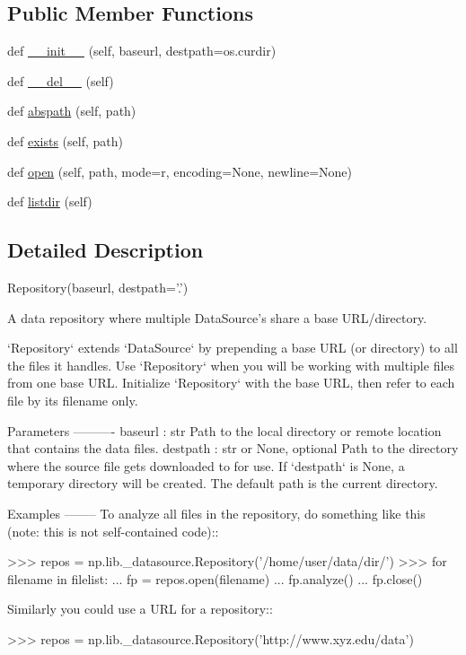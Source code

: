 \subsection*{Public Member Functions}
\begin{DoxyCompactItemize}
\item 
def \hyperlink{classnumpy_1_1lib_1_1__datasource_1_1Repository_a189f98cd6d7fda31f82e16f34f7ca822}{\+\_\+\+\_\+init\+\_\+\+\_\+} (self, baseurl, destpath=os.\+curdir)
\item 
def \hyperlink{classnumpy_1_1lib_1_1__datasource_1_1Repository_af4351dafdaa76531954a2df8117617c8}{\+\_\+\+\_\+del\+\_\+\+\_\+} (self)
\item 
def \hyperlink{classnumpy_1_1lib_1_1__datasource_1_1Repository_a8535769f09538e2a46e2417ac36e1dfc}{abspath} (self, path)
\item 
def \hyperlink{classnumpy_1_1lib_1_1__datasource_1_1Repository_aa3c775ac9ca505033fcaa34327f3e81b}{exists} (self, path)
\item 
def \hyperlink{classnumpy_1_1lib_1_1__datasource_1_1Repository_a3bc743780b0bc4148dca0dbf5f3d7f18}{open} (self, path, mode=\textquotesingle{}r\textquotesingle{}, encoding=None, newline=None)
\item 
def \hyperlink{classnumpy_1_1lib_1_1__datasource_1_1Repository_a5712ee37b741dedc92dc0e45490cf982}{listdir} (self)
\end{DoxyCompactItemize}


\subsection{Detailed Description}
\begin{DoxyVerb}Repository(baseurl, destpath='.')

A data repository where multiple DataSource's share a base
URL/directory.

`Repository` extends `DataSource` by prepending a base URL (or
directory) to all the files it handles. Use `Repository` when you will
be working with multiple files from one base URL.  Initialize
`Repository` with the base URL, then refer to each file by its filename
only.

Parameters
----------
baseurl : str
    Path to the local directory or remote location that contains the
    data files.
destpath : str or None, optional
    Path to the directory where the source file gets downloaded to for
    use.  If `destpath` is None, a temporary directory will be created.
    The default path is the current directory.

Examples
--------
To analyze all files in the repository, do something like this
(note: this is not self-contained code)::

    >>> repos = np.lib._datasource.Repository('/home/user/data/dir/')
    >>> for filename in filelist:
    ...     fp = repos.open(filename)
    ...     fp.analyze()
    ...     fp.close()

Similarly you could use a URL for a repository::

    >>> repos = np.lib._datasource.Repository('http://www.xyz.edu/data')\end{DoxyVerb}
 

